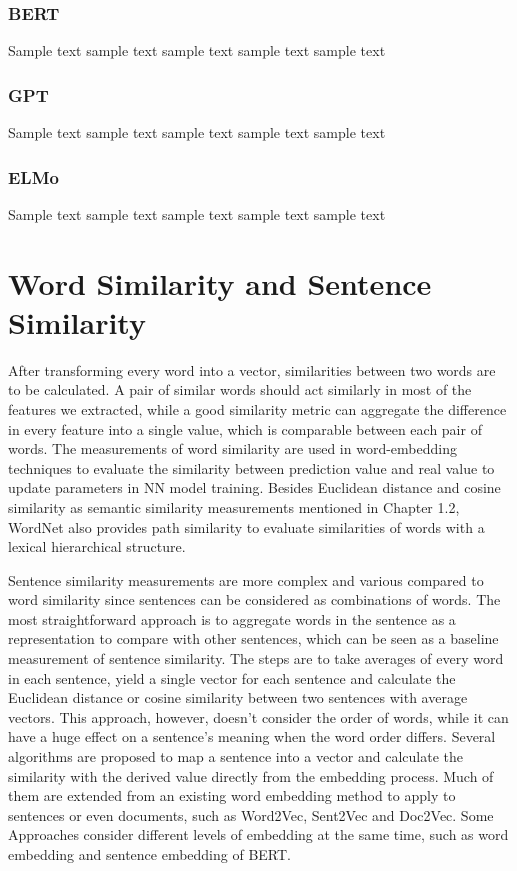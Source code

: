 \subsubsection{BERT}
Sample text sample text sample text sample text sample text

\subsubsection{GPT}
Sample text sample text sample text sample text sample text

\subsubsection{ELMo}
Sample text sample text sample text sample text sample text


\section{Word Similarity and Sentence Similarity}
After transforming every word into a vector, similarities between two words are to be calculated. 
A pair of similar words should act similarly in most of the features we extracted, while a good similarity metric can aggregate the difference in every feature into a single value, which is comparable between each pair of words.
The measurements of word similarity are used in word-embedding techniques to evaluate the similarity between prediction value and real value to update parameters in NN model training.
Besides Euclidean distance and cosine similarity as semantic similarity measurements mentioned in Chapter 1.2, WordNet also provides path similarity to evaluate similarities of words with a lexical hierarchical structure.

Sentence similarity measurements are more complex and various compared to word similarity since sentences can be considered as combinations of words.
The most straightforward approach is to aggregate words in the sentence as a representation to compare with other sentences, which can be seen as a baseline measurement of sentence similarity.
The steps are to take averages of every word in each sentence, yield a single vector for each sentence and calculate the Euclidean distance or cosine similarity between two sentences with average vectors.
This approach, however, doesn't consider the order of words, while it can have a huge effect on a sentence's meaning when the word order differs.
Several algorithms are proposed to map a sentence into a vector and calculate the similarity with the derived value directly from the embedding process.
Much of them are extended from an existing word embedding method to apply to sentences or even documents, such as Word2Vec, Sent2Vec and Doc2Vec.
Some Approaches consider different levels of embedding at the same time, such as word embedding and sentence embedding of BERT.

